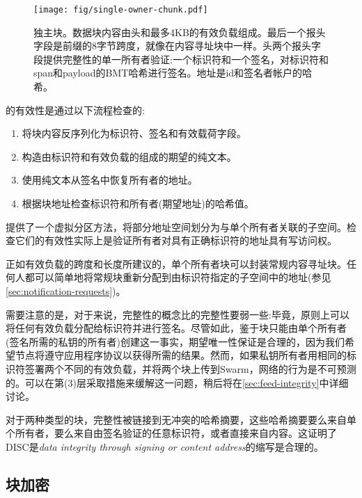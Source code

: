 \begin{figure}[htbp]
   \centering
   \texttt{[image: fig/single-owner-chunk.pdf]}
   \caption[尔格chunk\statusgreen]{独主块。数据块内容由头和最多4KB的有效负载组成。最后一个报头字段是前缀的8字节跨度，就像在内容寻址块中一样。头两个报头字段提供完整性的单一所有者验证:一个标识符和一个签名，对标识符和span和payload的BMT哈希进行签名。地址是id和签名者帐户的哈希。}
   \label{fig:single-owner-chunks}
\end{figure}

的有效性是通过以下流程检查的:

\begin{enumerate}
    \item 将块内容反序列化为标识符、签名和有效载荷字段。
    \item 构造由标识符和有效负载的组成的期望的纯文本。
    \item 使用纯文本从签名中恢复所有者的地址。
    \item 根据块地址检查标识符和所有者(期望地址)的哈希值。
\end{enumerate}

提供了一个虚拟分区方法，将部分地址空间划分为与单个所有者关联的子空间。检查它们的有效性实际上是验证所有者对具有正确标识符的地址具有写访问权。

正如有效负载的跨度和长度所建议的，单个所有者块可以封装常规内容寻址块。任何人都可以简单地将常规块重新分配到由标识符指定的子空间中的地址(参见\ref{sec:notification-requests})。


需要注意的是，对于来说，完整性的概念比的完整性要弱一些:毕竟，原则上可以将任何有效负载分配给标识符并进行签名。尽管如此，鉴于块只能由单个所有者(签名所需的私钥的所有者)创建这一事实，期望唯一性保证是合理的，因为我们希望节点将遵守应用程序协议以获得所需的结果。然而，如果私钥所有者用相同的标识符签署两个不同的有效负载，并将两个块上传到Swarm，网络的行为是不可预测的。可以在第(3)层采取措施来缓解这一问题，稍后将在\ref{sec:feed-integrity}中详细讨论。

对于两种类型的块，完整性被链接到无冲突的哈希摘要，这些哈希摘要要么来自单个所有者，要么来自由签名验证的任意标识符，或者直接来自内容。这证明了DISC是\emph{data integrity through signing or content address}的缩写是合理的。

\subsection{块加密\statusgreen}\label{sec:chunk-encryption}

